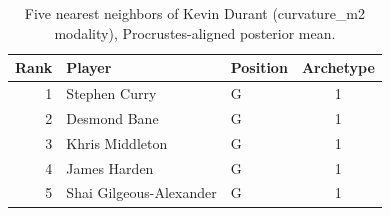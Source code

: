 \begin{table}[htbp]
  \centering\small
  \begin{tabular}{rllc}
    \toprule
    Rank & Player & Position & Archetype \\
    \midrule
    1 & Stephen Curry & G & 1 \\
    2 & Desmond Bane & G & 1 \\
    3 & Khris Middleton & G & 1 \\
    4 & James Harden & G & 1 \\
    5 & Shai Gilgeous-Alexander & G & 1 \\
    \bottomrule
  \end{tabular}
  \caption{Five nearest neighbors of Kevin Durant (curvature_m2 modality), Procrustes-aligned posterior mean.}
  \label{tab:Kevin_Durant_neighbors_curvature_m2}
\end{table}

